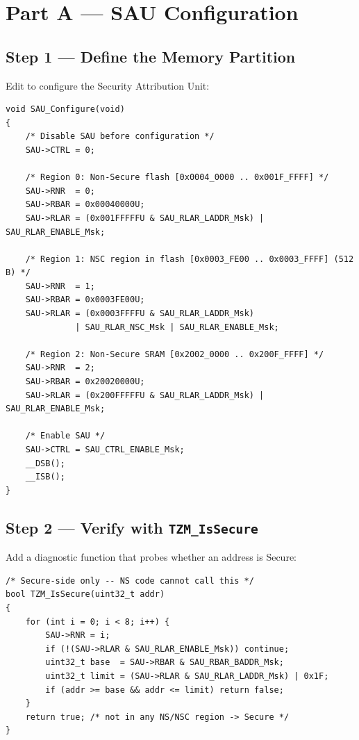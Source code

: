 \documentclass[11pt, a4paper]{article}
\begin{document}
\section{Part A --- SAU Configuration}

\subsection{Step 1 --- Define the Memory Partition}

Edit  to configure the Security Attribution Unit:

\begin{lstlisting}[style=cstyle]
void SAU_Configure(void)
{
    /* Disable SAU before configuration */
    SAU->CTRL = 0;

    /* Region 0: Non-Secure flash [0x0004_0000 .. 0x001F_FFFF] */
    SAU->RNR  = 0;
    SAU->RBAR = 0x00040000U;
    SAU->RLAR = (0x001FFFFFU & SAU_RLAR_LADDR_Msk) | SAU_RLAR_ENABLE_Msk;

    /* Region 1: NSC region in flash [0x0003_FE00 .. 0x0003_FFFF] (512 B) */
    SAU->RNR  = 1;
    SAU->RBAR = 0x0003FE00U;
    SAU->RLAR = (0x0003FFFFU & SAU_RLAR_LADDR_Msk)
              | SAU_RLAR_NSC_Msk | SAU_RLAR_ENABLE_Msk;

    /* Region 2: Non-Secure SRAM [0x2002_0000 .. 0x200F_FFFF] */
    SAU->RNR  = 2;
    SAU->RBAR = 0x20020000U;
    SAU->RLAR = (0x200FFFFFU & SAU_RLAR_LADDR_Msk) | SAU_RLAR_ENABLE_Msk;

    /* Enable SAU */
    SAU->CTRL = SAU_CTRL_ENABLE_Msk;
    __DSB();
    __ISB();
}
\end{lstlisting}

\subsection{Step 2 --- Verify with \texttt{TZM\_IsSecure}}

Add a diagnostic function that probes whether an address is Secure:

\begin{lstlisting}[style=cstyle]
/* Secure-side only -- NS code cannot call this */
bool TZM_IsSecure(uint32_t addr)
{
    for (int i = 0; i < 8; i++) {
        SAU->RNR = i;
        if (!(SAU->RLAR & SAU_RLAR_ENABLE_Msk)) continue;
        uint32_t base  = SAU->RBAR & SAU_RBAR_BADDR_Msk;
        uint32_t limit = (SAU->RLAR & SAU_RLAR_LADDR_Msk) | 0x1F;
        if (addr >= base && addr <= limit) return false;
    }
    return true; /* not in any NS/NSC region -> Secure */
}
\end{lstlisting}
\end{document}

